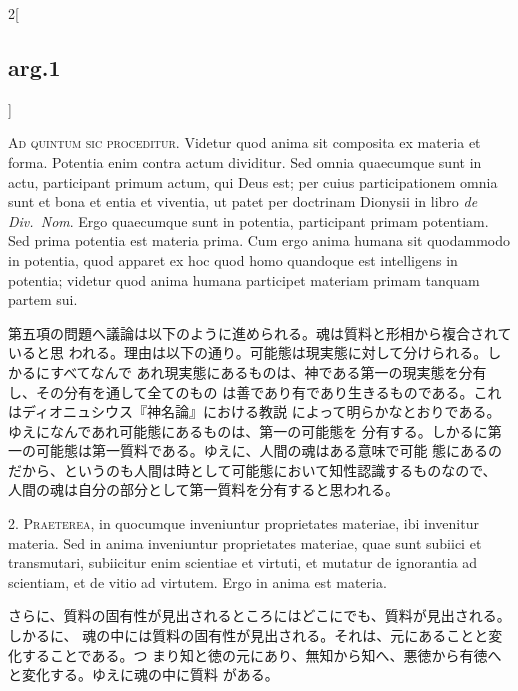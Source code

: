 \documentclass[paper=a4paper,fontsize=10pt,jafontsize=9pt,titlepage]{jlreq}
\begin{document}
\vspace{2em}
\begin{paracol}{2}[\subsection{arg.1}]

{\scshape Ad quintum sic proceditur}. Videtur quod anima sit composita
ex materia et forma. Potentia enim contra actum dividitur. Sed omnia
quaecumque sunt in actu, participant primum actum, qui Deus est; per
cuius participationem omnia sunt et bona et entia et viventia, ut
patet per doctrinam Dionysii in libro {\itshape de Div.~Nom}. Ergo quaecumque
sunt in potentia, participant primam potentiam. Sed prima potentia est
materia prima. Cum ergo anima humana sit quodammodo in potentia, quod
apparet ex hoc quod homo quandoque est intelligens in potentia;
videtur quod anima humana participet materiam primam tanquam partem
sui.

\switchcolumn

第五項の問題へ議論は以下のように進められる。魂は質料と形相から複合されていると思
われる。理由は以下の通り。可能態は現実態に対して分けられる。しかるにすべてなんで
あれ現実態にあるものは、神である第一の現実態を分有し、その分有を通して全てのもの
は善であり有であり生きるものである。これはディオニュシウス『神名論』における教説
によって明らかなとおりである。ゆえになんであれ可能態にあるものは、第一の可能態を
分有する。しかるに第一の可能態は第一質料である。ゆえに、人間の魂はある意味で可能
態にあるのだから、というのも人間は時として可能態において知性認識するものなので、
人間の魂は自分の部分として第一質料を分有すると思われる。


2. {\scshape Praeterea}, in quocumque inveniuntur proprietates materiae, ibi
invenitur materia. Sed in anima inveniuntur proprietates materiae, quae sunt
subiici et transmutari, subiicitur enim scientiae et virtuti, et mutatur de
ignorantia ad scientiam, et de vitio ad virtutem. Ergo in anima est materia.

\switchcolumn

さらに、質料の固有性が見出されるところにはどこにでも、質料が見出される。しかるに、
魂の中には質料の固有性が見出される。それは、元にあることと変化することである。つ
まり知と徳の元にあり、無知から知へ、悪徳から有徳へと変化する。ゆえに魂の中に質料
がある。


\end{paracol}
\end{document}
